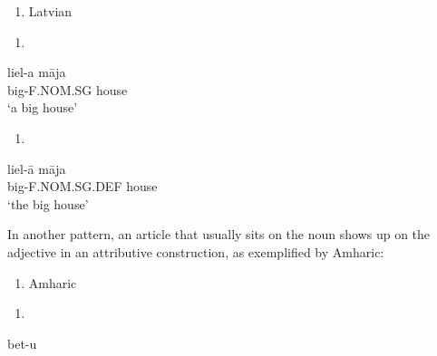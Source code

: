 \begin{enumerate} %
\item 
Latvian

\end{enumerate} %
\setcounter{listLFOxcviiileveli}{0}
\begin{enumerate} %
\item 
\end{enumerate} %
\ea\label{}
\gll liel-a  m\=aja\\


big-F.NOM.SG  house\\ %


‘a big house’
\z


\begin{enumerate} %
\item 
\end{enumerate} %
\ea\label{}
\gll liel-\=a  m\=aja\\


big-F.NOM.SG.DEF  house\\ %


‘the big house’
\z


In another pattern, an article that usually sits on the noun shows up on the adjective in an attributive construction, as exemplified by Amharic:

\begin{enumerate} %
\item 
Amharic 

\end{enumerate} %
\setcounter{listLFOxcviiileveli}{0}
\begin{enumerate} %
\item 
\end{enumerate} %
\ea\label{}
\gll bet-u\\



